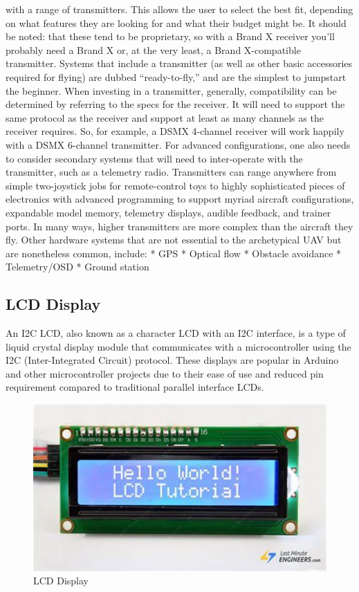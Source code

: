\documentclass[conference]{IEEEtran}
\begin{document}
with a range of transmitters. This allows the user to select the best fit, depending on what features they are
looking for and what their budget might be. It should be noted: that these tend to be proprietary, so with a
Brand X receiver you'll probably need a Brand X or, at the very least, a Brand X-compatible transmitter.
Systems that include a transmitter (as well as other basic accessories required for flying) are dubbed
“ready-to-fly,” and are the simplest to jumpstart the beginner.
When investing in a transmitter, generally, compatibility can be determined by referring to the specs for
the receiver. It will need to support the same protocol as the receiver and support at least as many
channels as the receiver requires. So, for example, a DSMX 4-channel receiver will work happily with a
DSMX 6-channel transmitter. For advanced configurations, one also needs to consider secondary systems
that will need to inter-operate with the transmitter, such as a telemetry radio.
Transmitters can range anywhere from simple two-joystick jobs for remote-control toys to highly
sophisticated pieces of electronics with advanced programming to support myriad aircraft configurations,
expandable model memory, telemetry displays, audible feedback, and trainer ports. In many ways, higher transmitters are more complex than the aircraft they fly.
Other hardware systems that are not essential to the archetypical UAV but are nonetheless common,
include:
* GPS
* Optical flow
* Obstacle avoidance
* Telemetry/OSD
* Ground station

\subsection{LCD Display}

An I2C LCD, also known as a character LCD with an I2C interface, is a type of liquid crystal display module that communicates with a microcontroller using the I2C (Inter-Integrated Circuit) protocol. These displays are popular in Arduino and other microcontroller projects due to their ease of use and reduced pin requirement compared to traditional parallel interface LCDs.
\begin{figure}[h]
    \centering
    \includegraphics[width=\linewidth]{images/display.jpg}
    \caption{LCD Display}
    \label{fig:enter-label}
\end{figure}
\end{document}
